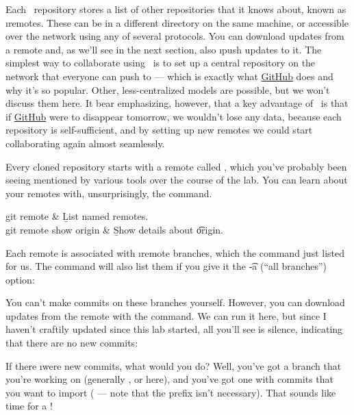 \documentclass[letterpaper,12pt,titlepage,twoside]{article}
\begin{document}
Each \git\ repository stores a list of other repositories that it knows about,
known as \i{remotes}. These can be in a different directory on the same
machine, or accessible over the network using any of several protocols. You
can download updates from a remote and, as we'll see in the next section, also
\i{push} updates to it. The simplest way to collaborate using \git\ is to set
up a central repository on the network that everyone can push to --- which is
exactly what \href{https://github.com/}{GitHub} does and why it's so popular.
Other, less-centralized models are possible, but we won't discuss them here.
It bear emphasizing, however, that a key advantage of \git\ is that if
\href{https://github.com/}{GitHub} were to disappear tomorrow, we wouldn't
lose any data, because each repository is self-sufficient, and by setting up
new remotes we could start collaborating again almost seamlessly.

Every cloned repository starts with a remote called , which you've
probably been seeing mentioned by various tools over the course of the lab.
You can learn about your remotes with, unsurprisingly, the 
command.

\begin{typeme}
git remote & \b{List named remotes.} \\
git remote show origin & \b{Show details about \t{origin}.}
\end{typeme}

Each remote is associated with \i{remote branches}, which the  command just listed for us. The  command will also list
them if you give it the \t{-a} (``all branches'') option:


You can't make commits on these branches yourself. However, you can download
updates from the remote with the  command. We can run it here, but
since I haven't craftily updated  since this lab started, all you'll
see is silence, indicating that there are no new commits:


If there \i{were} new commits, what would you do? Well, you've got a branch
that you're working on (generally , or  here), and
you've got one with commits that you want to import ( ---
note that the  prefix isn't necessary). That sounds like time for
a !
\end{document}
